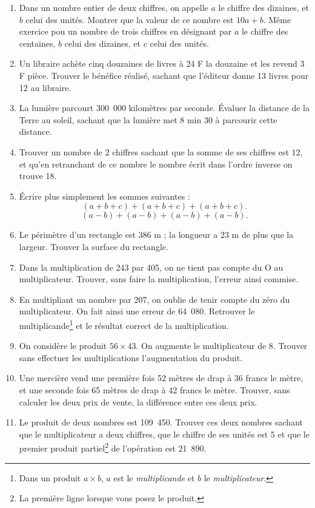 \documentclass[12 pt]{report}
\theoremstyle{plain}
\newcounter{n}
\begin{document}
 \begin{enumerate}
 \item Dans un nombre entier de deux chiffres, on appelle $a$ le chiffre des dizaines, et $b$ celui des unités. Montrer que la valeur de ce nombre est $10a+b$.
 Même exercice pou un nombre de trois chiffres en désignant par $a$ le chiffre des centaines, $b$ celui des dizaines, et $c$ celui des unités.
 \item Un libraire achète cinq douzaines de livres à 
 24 F la douzaine et les revend 3 F pièce. Trouver le 
 bénéfice réalisé, sachant que l'éditeur donne 13 livres pour 12 au libraire. 
 \item La lumière parcourt 300~000 kilomètres par
 seconde. Évaluer la distance de la Terre au soleil,
 sachant que la lumière met $8$ min $30$ à parcourir
 cette distance.
 \item Trouver un nombre de $2$ chiffres sachant que la somme de ses chiffres est $12$, et qu'en 
 retranchant de ce nombre le nombre écrit dans l'ordre
 inverse on trouve 18. 
 \item Écrire plus simplement les sommes suivantes :
 \[ (a + b + c) + (a + b + c) + (a + b + c).\]
 \[(a - b) + (a - b) + (a - b) + (a - b).\]
 \item Le périmètre d'un rectangle est 386 m ; 
 la longueur a 23 m de plus que la largeur.
 Trouver la surface du rectangle.
 \item Dans la multiplication de 243 par 405, on ne tient pas compte du O au multiplicateur. Trouver, sans faire la multiplication, l'erreur ainsi commise. 
 \item En multipliant un nombre par 207, on oublie de 
 tenir compte du zéro du multiplicateur. On fait ainsi
 une erreur de 64~080. Retrouver le multiplicande\footnote{Dans un produit $a\times b$, $a$ est le \emph{multiplicande} et $b$ le \emph{multiplicateur}.} et le résultat correct de la multiplication.
 \item On considère le produit $56 \times 43$. On augmente le multiplicateur de $8$. Trouver sans effectuer les multiplications l'augmentation du produit. 
 \item Une mercière vend une première fois 52 mètres de drap à 36 francs le mètre, et une seconde fois 65 mètres de drap à 42 francs le mètre. Trouver, sans calculer les deux prix de vente, la différence entre ces deux prix. 
 \item Le produit de deux nombres est 109~450. Trouver ces deux nombres sachant que le multiplicateur a deux chiffres, que le chiffre de ses unités est 5 et que le premier produit partiel\footnote{La première ligne lorsque vous posez le produit.} de l'opération est 21~890. 

\end{enumerate}
\end{document}
